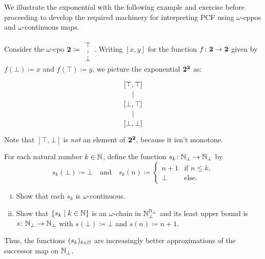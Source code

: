 We illustrate the exponential with the following example and exercise before
proceeding to develop the required machinery for interpreting PCF using
\(\omega\)-cppos and \(\omega\)-continuous maps.

\begin{example}
  Consider the \(\omega\)-cpo \(\Two \coloneqq
  \begin{tikzcd}[row sep=5pt]
    \top \ar[d,no head] \\ \bot
  \end{tikzcd}\). Writing \([x,y]\) for the function
  \({f \colon \mathbf 2 \to \mathbf 2}\) given by \(f(\bot) \coloneqq x\) and
  \(f(\top) \coloneqq y\), we picture the exponential \(\mathbf 2^\mathbf 2\) as:
  \[
  \begin{tikzcd}[row sep=10pt]
    {[\top,\top]} \ar[d, no head] \\
    {[\bot,\top]} \ar[d, no head] \\
    {[\bot,\bot]}
  \end{tikzcd}
  \]
  Note that \([\top,\bot]\) is \emph{not} an element of \(\mathbf 2^\mathbf 2\), because
  it isn't monotone.
\end{example}

\begin{exercise}\label{exer:approximating-successor}
  For each natural number \(k \in \mathbb N\), define the function
  \(s_k \colon \mathbb N_\bot \to \mathbb N_\bot\) by
  \[
    s_k(\bot) \coloneqq \bot
    \quad\text{and}\quad
    s_k(n) \coloneqq
    \begin{cases}
      n+1 &\text{if \(n \leq k\)},
      \\ \bot &\text{else}.
    \end{cases}
  \]
  \begin{enumerate}[(i)]
  \item Show that each \(s_k\) is \(\omega\)-continuous.
  \item Show that \(\{s_k \mid k \in \mathbb N\}\) is an \(\omega\)-chain in
    \(\mathbb N_\bot^{\mathbb N_\bot}\) and its least upper bound is
    \(s \colon \mathbb N_\bot \to \mathbb N_\bot\) with \(s(\bot) \coloneqq \bot\) and
    \(s(n) \coloneqq n+1\).
  \end{enumerate}
  Thus, the functions \((s_k)_{k \in \mathbb N}\) are increasingly better approximations of the
  successor map on \(\mathbb N_\bot\).
\end{exercise}

